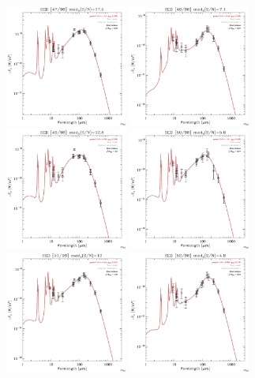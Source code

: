 \documentclass[preprint2,longabstract]{aastex}
\begin{document}
\begin{figure}
    \includegraphics[trim=0 2mm 0 0, clip, width=40mm]{../SEDs/sed_47.pdf}
	\includegraphics[trim=0 2mm 0 0, clip, width=40mm]{../SEDs/sed_48.pdf}
	\includegraphics[trim=0 2mm 0 0, clip, width=40mm]{../SEDs/sed_49.pdf}
	\includegraphics[trim=0 2mm 0 0, clip, width=40mm]{../SEDs/sed_50.pdf}
	\includegraphics[trim=0 2mm 0 0, clip, width=40mm]{../SEDs/sed_51.pdf}
	\includegraphics[trim=0 2mm 0 0, clip, width=40mm]{../SEDs/sed_52.pdf}

\end{figure}
\end{document}
